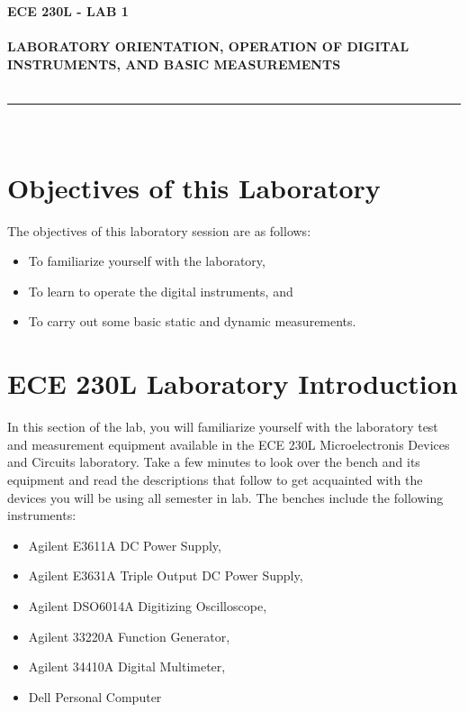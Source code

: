 \documentclass[12pt]{../manual}
\begin{document}
\begin{center}
\textbf{\huge ECE 230L - LAB 1}\\~\\
\textbf{\large LABORATORY ORIENTATION, OPERATION OF DIGITAL INSTRUMENTS, AND BASIC MEASUREMENTS }\\~\\
\rule{6.5in}{0.5mm}\\
\end{center}

\tableofcontents

\listoffigures

\newpage
%
\section{Objectives of this Laboratory}
The objectives of this laboratory session are as follows:
\begin{itemize}
\item To familiarize yourself with the laboratory, 
\item To learn to operate the digital instruments, and 
\item To carry out some basic static and dynamic measurements. 
\end{itemize}

\section{ECE 230L Laboratory Introduction}
In this section of the lab, you will familiarize yourself with the laboratory test and measurement equipment available in the ECE 230L Microelectronis Devices and Circuits laboratory.  Take a few minutes to look over the bench and its equipment and read the descriptions that follow to get acquainted with the devices you will be using all semester in lab. The benches include the following instruments:
\begin{itemize}
\item Agilent E3611A DC Power Supply, 
\item Agilent E3631A Triple Output DC Power Supply, 
\item Agilent DSO6014A Digitizing Oscilloscope, 
\item Agilent 33220A Function Generator, 
\item Agilent 34410A Digital Multimeter, 
\item Dell Personal Computer
\end{itemize}
\end{document}
